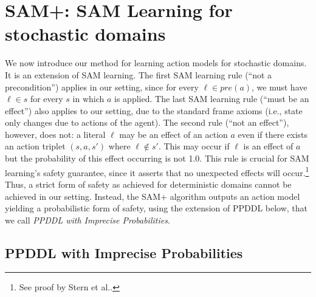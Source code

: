 \documentclass[letterpaper]{article} %
\newcommand{\pre}{\textit{pre}}
\newcommand{\tuple}[1]{\ensuremath{\left \langle #1 \right \rangle }}
\begin{document}
\section{SAM+: SAM Learning for stochastic domains}



We now introduce our method for learning action models for stochastic domains. It is an extension of SAM learning.
The first SAM learning rule (``not a precondition'') applies in our setting, since for every $\ell\in\pre(a)$, we must have $\ell\in s$ for every $s$ in which $a$ is applied. 
The last SAM learning rule (``must be an effect'') also applies to our setting, due to the standard frame axioms (i.e., state only changes due to actions of the agent). 
The second rule (``not an effect''), however, does not: a literal $\ell$ may be an effect of an action $a$ even if there exists an action triplet $(s,a,s')$ where $\ell\notin s'$. 
This may occur if $\ell$ is an effect of $a$ but the probability of this effect occurring is not 1.0. 
This rule is crucial for SAM learning's safety guarantee, since it asserts that no unexpected effects will occur.\footnote{See proof by Stern et al..} 
Thus, a strict form of safety as achieved for deterministic domains cannot be achieved in our setting. 
Instead, the SAM+ algorithm outputs an action model
yielding a probabilistic form of safety, using the extension of PPDDL below, that we call \emph{PPDDL with Imprecise Probabilities}. 



\subsection{PPDDL with Imprecise Probabilities}
\end{document}
